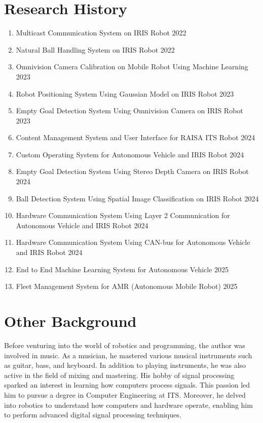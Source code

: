 \section*{Research History}
\begin{enumerate}
    \item Multicast Communication System on IRIS Robot 2022
    \item Natural Ball Handling System on IRIS Robot 2022
    \item Omnivision Camera Calibration on Mobile Robot Using Machine Learning 2023
    \item Robot Positioning System Using Gaussian Model on IRIS Robot 2023
    \item Empty Goal Detection System Using Omnivision Camera on IRIS Robot 2023
    \item Content Management System and User Interface for RAISA ITS Robot 2024
    \item Custom Operating System for Autonomous Vehicle and IRIS Robot 2024
    \item Empty Goal Detection System Using Stereo Depth Camera on IRIS Robot 2024
    \item Ball Detection System Using Spatial Image Classification on IRIS Robot 2024
    \item Hardware Communication System Using Layer 2 Communication for Autonomous Vehicle and IRIS Robot 2024
    \item Hardware Communication System Using CAN-bus for Autonomous Vehicle and IRIS Robot 2024
    \item End to End Machine Learning System for Autonomous Vehicle 2025
    \item Fleet Management System for AMR (Autonomous Mobile Robot) 2025
\end{enumerate}

\section*{Other Background}
Before venturing into the world of robotics and programming, the author was involved in music. As a musician, he mastered various musical instruments such as guitar, bass, and keyboard. In addition to playing instruments, he was also active in the field of mixing and mastering. His hobby of signal processing sparked an interest in learning how computers process signals. This passion led him to pursue a degree in Computer Engineering at ITS. Moreover, he delved into robotics to understand how computers and hardware operate, enabling him to perform advanced digital signal processing techniques.

